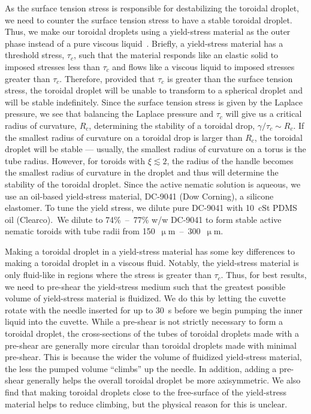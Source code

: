 As the surface tension stress is responsible for destabilizing the toroidal droplet, we need to counter the surface tension stress to have a stable toroidal droplet.
Thus, we make our toroidal droplets using a yield-stress material as the outer phase instead of a pure viscous liquid~\cite{RN47,RN258}.
Briefly, a yield-stress material has a threshold stress, $\tau_c$, such that the material responds like an elastic solid to imposed stresses less than $\tau_c$ and flows like a viscous liquid to imposed stresses greater than $\tau_c$.
Therefore, provided that $\tau_c$ is greater than the surface tension stress, the toroidal droplet will be unable to transform to a spherical droplet and will be stable indefinitely.
Since the surface tension stress is given by the Laplace pressure, we see that balancing the Laplace pressure and $\tau_c$ will give us a critical radius of curvature, $R_c$, determining the stability of a toroidal drop, $\gamma/\tau_c \sim R_c$.
If the smallest radius of curvature on a toroidal drop is larger than $R_c$, the toroidal droplet will be stable --- usually, the smallest radius of curvature on a torus is the tube radius.
However, for toroids with $\xi \lesssim 2$, the radius of the handle becomes the smallest radius of curvature in the droplet and thus will determine the stability of the toroidal droplet.
Since the active nematic solution is aqueous, we use an oil-based yield-stress material, DC-9041 (Dow Corning), a silicone elastomer.
To tune the yield stress, we dilute pure DC-9041 with 10~cSt PDMS oil (Clearco).\
We dilute to 74\%~--~77\% w/w DC-9041 to form stable active nematic toroids with tube radii from 150~$\upmu$m~--~300~$\upmu$m.

Making a toroidal droplet in a yield-stress material has some key differences to making a toroidal droplet in a viscous fluid.
Notably, the yield-stress material is only fluid-like in regions where the stress is greater than $\tau_c$.
Thus, for best results, we need to pre-shear the yield-stress medium such that the greatest possible volume of yield-stress material is fluidized.
We do this by letting the cuvette rotate with the needle inserted for up to 30~s before we begin pumping the inner liquid into the cuvette.
While a pre-shear is not strictly necessary to form a toroidal droplet, the cross-sections of the tubes of toroidal droplets made with a pre-shear are generally more circular than toroidal droplets made with minimal pre-shear.
This is because the wider the volume of fluidized yield-stress material, the less the pumped volume ``climbs'' up the needle.
In addition, adding a pre-shear generally helps the overall toroidal droplet be more axisymmetric.
We also find that making toroidal droplets close to the free-surface of the yield-stress material helps to reduce climbing, but the physical reason for this is unclear.

